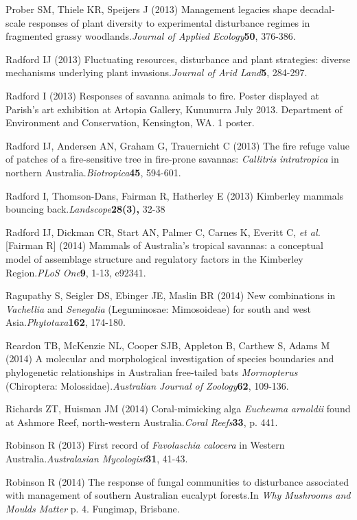 \documentclass[version=last, paper=a4, DIV=18, usenames, dvipsnames]{scrartcl}
\begin{document}
Prober SM, Thiele KR, Speijers J (2013) Management legacies shape decadal-scale responses of plant diversity to experimental disturbance regimes in fragmented grassy woodlands.\emph{Journal of Applied Ecology}\textbf{50}, 376-386.


Radford IJ (2013) Fluctuating resources, disturbance and plant strategies: diverse mechanisms underlying plant invasions.\emph{Journal of Arid Land}\textbf{5}, 284-297.


Radford I (2013) Responses of savanna animals to fire. Poster displayed at Parish's art exhibition at Artopia Gallery, Kununurra July 2013. Department of Environment and Conservation, Kensington, WA. 1 poster.


Radford IJ, Andersen AN, Graham G, Trauernicht C (2013) The fire refuge value of patches of a fire-sensitive tree in fire-prone savannas: \emph{Callitris} \emph{intratropica} in northern Australia.\emph{Biotropica}\textbf{45}, 594-601.


Radford I, Thomson-Dans, Fairman R, Hatherley E (2013) Kimberley mammals bouncing back.\emph{Landscope}\textbf{28(3),} 32-38


Radford IJ, Dickman CR, Start AN, Palmer C, Carnes K, Everitt C, \emph{et al.} [Fairman R] (2014) Mammals of Australia's tropical savannas: a conceptual model of assemblage structure and regulatory factors in the Kimberley Region.\emph{PLoS One}\textbf{9}, 1-13, e92341.


Ragupathy S, Seigler DS, Ebinger JE, Maslin BR (2014) New combinations in \emph{Vachellia} and \emph{Senegalia} (Leguminosae: Mimosoideae) for south and west Asia.\emph{Phytotaxa}\textbf{162}, 174-180.


Reardon TB, McKenzie NL, Cooper SJB, Appleton B, Carthew S, Adams M (2014) A molecular and morphological investigation of species boundaries and phylogenetic relationships in Australian free-tailed bats \emph{Mormopterus} (Chiroptera: Molossidae).\emph{Australian Journal of Zoology}\textbf{62}, 109-136.


Richards ZT, Huisman JM (2014) Coral-mimicking alga \emph{Eucheuma} \emph{arnoldii} found at Ashmore Reef, north-western Australia.\emph{Coral Reefs}\textbf{33}, p. 441.


Robinson R (2013) First record of \emph{Favolaschia} \emph{calocera} in Western Australia.\emph{Australasian Mycologist}\textbf{31}, 41-43.


Robinson R (2014) The response of fungal communities to disturbance associated with management of southern Australian eucalypt forests.In \emph{Why Mushrooms and Moulds Matter} p. 4. Fungimap, Brisbane.
\end{document}
